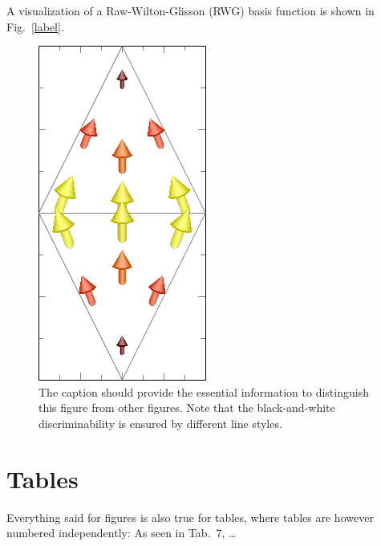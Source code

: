 A visualization of a Raw-Wilton-Glisson (RWG) basis function is shown in Fig.~\ref{label}.
\begin{figure}[tp]
	\centering
	\includegraphics{./Figures/Fig_5__RWG/Fig_5__RWG.pdf}
	\caption{The caption should provide the essential information to distinguish this figure from other figures. 
		Note that the black-and-white discriminability is ensured by different line styles.}
	\label{fig:samplefigure3}
\end{figure}%


%
%
%        


\section{Tables}
Everything said for figures is also true for tables, where tables are however numbered independently: 
As seen in Tab.~7, \dots

